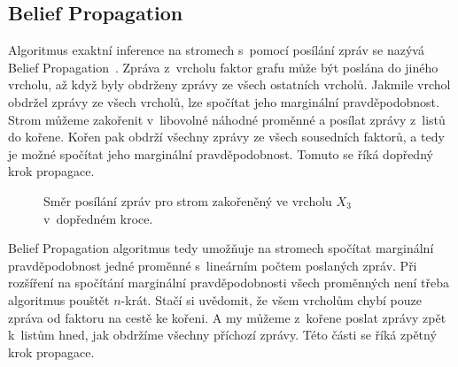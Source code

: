 \subsection{Belief Propagation}

Algoritmus exaktní inference na stromech s~pomocí posílání zpráv se nazývá Belief Propagation~\cite{pearl1988probabilistic}.
Zpráva z~vrcholu faktor grafu může být poslána do jiného vrcholu, až když byly obdrženy zprávy ze všech ostatních vrcholů.
Jakmile vrchol obdržel zprávy ze všech vrcholů, lze spočítat jeho marginální pravděpodobnost.
Strom můžeme zakořenit v~libovolné náhodné proměnné a posílat zprávy z~listů do kořene.
Kořen pak obdrží všechny zprávy ze všech sousedních faktorů, a tedy je možné spočítat jeho marginální pravděpodobnost.
Tomuto se říká dopředný krok propagace.

\begin{figure}[H]
\begin{center}
\end{center}
\caption{Směr posílání zpráv pro strom zakořeněný ve vrcholu $X_3$ v~dopředném kroce.}
\end{figure}

Belief Propagation algoritmus tedy umožňuje na stromech spočítat marginální pravděpodobnost jedné proměnné s~lineárním počtem poslaných zpráv.
Při rozšíření na spočítání marginální pravděpodobnosti všech proměnných není třeba algoritmus pouštět $n$-krát.
Stačí si uvědomit, že všem vrcholům chybí pouze zpráva od faktoru na cestě ke kořeni.
A my můžeme z~kořene poslat zprávy zpět k~listům hned, jak obdržíme všechny příchozí zprávy.
Této části se říká zpětný krok propagace.

